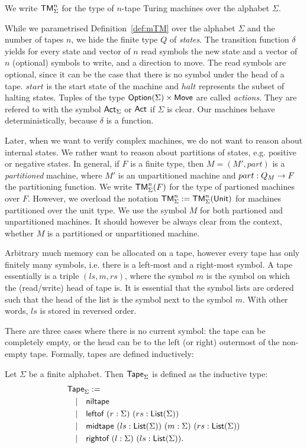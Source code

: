 We write $\textsf{TM}_\Sigma^n$ for the type of $n$-tape Turing machines over the alphabet $\Sigma$.

While we parametrised Definition~\ref{def:mTM} over the alphabet $\Sigma$ and the number of tapes $n$, we hide the finite type $Q$ of \emph{states}.
The transition function $\delta$ yields for every state and vector of $n$ read symbols the new state and a vector of $n$ (optional) symbols to write,
and a direction to move.  The read symbols are optional, since it can be the case that there is no symbol under the head of a tape.  $start$ is the
start state of the machine and $halt$ represents the subset of halting states.  Tuples of the type $\textsf{Option}(\Sigma) \times \textsf{Move}$ are called
\emph{actions}.  They are refered to with the symbol $\textsf{Act}_\Sigma$ or $\textsf{Act}$ if $\Sigma$ is clear.  Our machines behave deterministically,
because $\delta$ is a function.

Later, when we want to verify complex machines, we do not want to reason about internal states.  We rather want to reason about partitions of states,
e.g. positive or negative states.  In general, if $F$ is a finite type, then $M = (M', part)$ is a \emph{partitioned} machine, where $M'$ is an
unpartitioned machine and $part : Q_M \rightarrow F$ the partitioning function.  We write $\textsf{TM}_\Sigma^n(F)$ for the type of partioned machines over
$F$.  However, we overload the notation $\textsf{TM}_\Sigma^n := \textsf{TM}_\Sigma^n(\textsf{Unit})$ for machines partitioned over the unit type.  We use the symbol
$M$ for both partioned and unpartitioned machines.  It should however be always clear from the context, whether $M$ is a partitioned or unpartitioned
machine.

Arbitrary much memory can be allocated on a tape, however every tape has only finitely many symbols, i.e. there is a left-most and a right-most
symbol.  A tape essentially is a triple $(ls,m,rs)$, where the symbol $m$ is the symbol on which the (read/write) head of tape is.  It is essential
that the symbol lists are ordered such that the head of the list is the symbol next to the symbol $m$.  With other words, $ls$ is stored in reversed
order.

There are three cases where there is no current symbol: the tape can be completely empty, or the head can be to the left (or right) outermost of the
non-empty tape.  Formally, tapes are defined inductively:

\begin{definition}[Tape]
  \label{def:tape}
  Let $\Sigma$ be a finite alphabet.  Then $\textsf{Tape}_\Sigma$ is defined as the inductive type:
  \begin{align*}
    & \textsf{Tape}_\Sigma := \\
    & \quad | \quad \textsf{niltape} \\
    & \quad | \quad \textsf{leftof}  ~ (r:\Sigma) ~ (rs:\textsf{List}(\Sigma)) \\
    & \quad | \quad \textsf{midtape} ~ (ls:\textsf{List}(\Sigma)) ~ (m:\Sigma) ~ (rs:\textsf{List}(\Sigma)) \\
    & \quad | \quad \textsf{rightof} ~ (l:\Sigma) ~ (ls:\textsf{List}(\Sigma)).
  \end{align*}
\end{definition}

